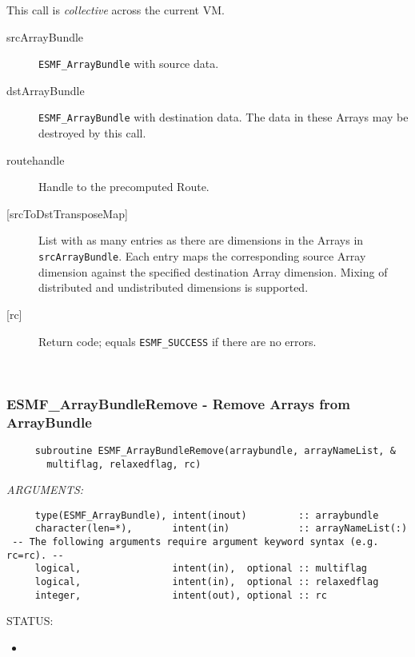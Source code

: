      This call is {\em collective} across the current VM.
  
     \begin{description}
     \item [srcArrayBundle]
       {\tt ESMF\_ArrayBundle} with source data.
     \item [dstArrayBundle]
       {\tt ESMF\_ArrayBundle} with destination data. The data in these Arrays
       may be destroyed by this call.
     \item [routehandle]
       Handle to the precomputed Route.
     \item [{[srcToDstTransposeMap]}]
       List with as many entries as there are dimensions in the Arrays in
       {\tt srcArrayBundle}. Each
       entry maps the corresponding source Array dimension against the 
       specified destination Array dimension. Mixing of distributed and
       undistributed dimensions is supported.
     \item [{[rc]}]
       Return code; equals {\tt ESMF\_SUCCESS} if there are no errors.
     \end{description}
   
 
\mbox{}\hrulefill\ 
 
\subsubsection [ESMF\_ArrayBundleRemove] {ESMF\_ArrayBundleRemove - Remove Arrays from ArrayBundle}


  
\begin{verbatim}     subroutine ESMF_ArrayBundleRemove(arraybundle, arrayNameList, &
       multiflag, relaxedflag, rc)\end{verbatim}{\em ARGUMENTS:}
\begin{verbatim}     type(ESMF_ArrayBundle), intent(inout)         :: arraybundle
     character(len=*),       intent(in)            :: arrayNameList(:)
 -- The following arguments require argument keyword syntax (e.g. rc=rc). --
     logical,                intent(in),  optional :: multiflag
     logical,                intent(in),  optional :: relaxedflag
     integer,                intent(out), optional :: rc\end{verbatim}
{\sf STATUS:}
   \begin{itemize}
   \item{}
   \end{itemize}
  
